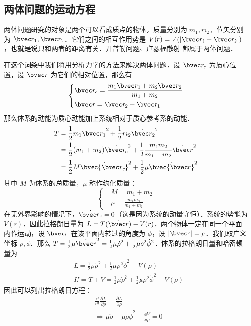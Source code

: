
\subsection{两体问题的运动方程}
两体问题研究的对象是两个可以看成质点的物体，质量分别为 $m_1,m_2$，位矢分别为 $\bvec r_1,\bvec r_2$．它们之间的相互作用势是 $V(r)=V(|\bvec r_1-\bvec r_2|)$，也就是说只和两者的距离有关．开普勒问题、卢瑟福散射 都属于两体问题．

在这个词条中我们将用分析力学的方法来解决两体问题．设 $\bvec r_c$ 为质心位置，设 $\bvec r$ 为它们的相对位置，那么有
\begin{equation}
\left\{
\begin{aligned}
&\bvec r_c=\frac{m_1\bvec r_1+ m_2\bvec r_2}{m_1+m_2}\\
&\bvec r=\bvec r_2-\bvec r_1
\end{aligned}
\right.
\end{equation}
那么体系的动能为质心动能加上系统相对于质心参考系的动能．
\begin{equation}
\begin{aligned}
T&=\frac{1}{2}m_1 \dot{\bvec r_1}^2+\frac{1}{2}m_2 \dot{\bvec r_2}^2\\
&=\frac{1}{2}(m_1+m_2)\dot{\bvec r_c}^2+\frac{1}{2}\frac{m_1m_2}{m_1+m_2}\dot{\bvec r}^2\\
&=\frac{1}{2}M \dot{\bvec{\bvec r_c}}^2+\frac{1}{2}\mu \dot{\bvec{\bvec r}}^2
\end{aligned}
\end{equation}
其中 $M$ 为体系的总质量，$\mu$ 称作约化质量：
\begin{equation}
\left\{
\begin{aligned}
&M=m_1+m_2\\
&\mu=\frac{m_1m_2}{m_1+m_2}
\end{aligned}
\right.
\end{equation}
在无外界影响的情况下，$\dot{\bvec r_c}=0$（这是因为系统的动量守恒）．系统的势能为 $V(r)$．因此拉格朗日量为 $L=T(\dot{\bvec r})-V(r)$．两个物体一定在同一个平面内作运动，设 $\bvec r$ 在该平面内转过的角度为 $\phi$，设 $|\bvec r|=\rho$．我们取广义坐标 $\rho,\phi$．那么 $T=\frac{1}{2}\mu \dot{\bvec r}^2=\frac{1}{2}\mu \dot \rho^2+\frac{1}{2}\mu \rho^2\dot\phi^2$．体系的拉格朗日量和哈密顿量为
\begin{equation}
\begin{aligned}
&L=\frac{1}{2}\mu \dot \rho^2+\frac{1}{2}\mu \rho^2\dot\phi^2-V(\rho)\\
&H=T+V=\frac{1}{2}\mu \dot \rho^2+\frac{1}{2}\mu \rho^2\dot\phi^2+V(\rho)
\end{aligned}
\end{equation}
因此可以列出拉格朗日方程：
\begin{equation}\label{twoobj_eq1}
\begin{aligned}
&\frac{\dd }{\dd t}\frac{\partial L}{\partial \dot\rho}=\frac{\partial L}{\partial \rho}\\&\Rightarrow \mu\ddot\rho-\mu\rho\dot\phi^2+\frac{\dd V}{\dd \rho}=0
\end{aligned}
\end{equation}

